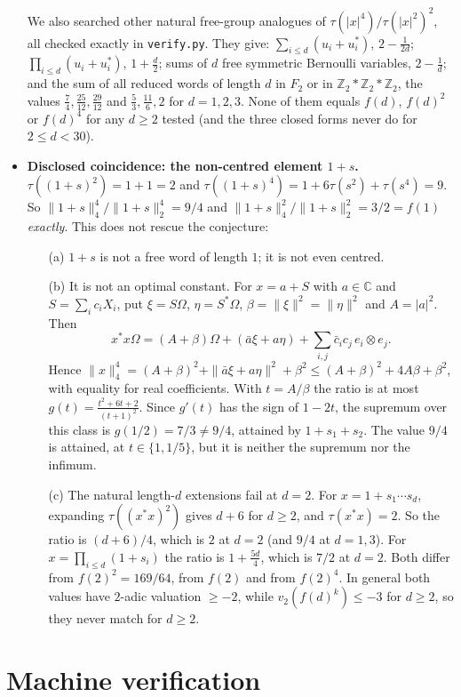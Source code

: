 \documentclass[11pt]{article}
\theoremstyle{definition}
\theoremstyle{remark}
\begin{document}
\begin{itemize}
We also searched other natural free-group analogues of $\tau(|x|^4)/\tau(|x|^2)^2$, all checked
exactly in \texttt{verify.py}. They give: $\sum_{i\le d}(u_i+u_i^*)$, $2-\frac1{2d}$;
$\prod_{i\le d}(u_i+u_i^*)$, $1+\frac d2$; sums of $d$ free symmetric Bernoulli variables,
$2-\frac1d$; and the sum of all reduced words of length $d$ in $F_2$ or in
$\mathbb Z_2*\mathbb Z_2*\mathbb Z_2$, the values $\frac74,\frac{25}{12},\frac{29}{12}$ and
$\frac53,\frac{11}6,2$ for $d=1,2,3$. None of them equals $f(d)$, $f(d)^2$ or $f(d)^4$ for any
$d\ge2$ tested (and the three closed forms never do for $2\le d<30$).
\item \textbf{Disclosed coincidence: the non-centred element $1+s$.} $\tau((1+s)^2)=1+1=2$ and
$\tau((1+s)^4)=1+6\tau(s^2)+\tau(s^4)=9$. So $\|1+s\|_4^4/\|1+s\|_2^4=9/4$ and
$\|1+s\|_4^2/\|1+s\|_2^2=3/2=f(1)$ \emph{exactly}. This does not rescue the conjecture:
\begin{enumerate}
\item[(a)] $1+s$ is not a free word of length $1$; it is not even centred.
\item[(b)] It is not an optimal constant. For $x=a+S$ with $a\in\mathbb C$ and
$S=\sum_ic_iX_i$, put $\xi=S\Omega$, $\eta=S^*\Omega$, $\beta=\|\xi\|^2=\|\eta\|^2$ and $A=|a|^2$.
Then
\[
x^*x\Omega=(A+\beta)\Omega+(\bar a\xi+a\eta)+\sum_{i,j}\bar c_ic_j\,e_i\otimes e_j .
\]
Hence $\|x\|_4^4=(A+\beta)^2+\|\bar a\xi+a\eta\|^2+\beta^2\le(A+\beta)^2+4A\beta+\beta^2$, with
equality for real coefficients. With $t=A/\beta$ the ratio is at most
$g(t)=\frac{t^2+6t+2}{(t+1)^2}$. Since $g'(t)$ has the sign of $1-2t$, the supremum over this class
is $g(1/2)=7/3\neq9/4$, attained by $1+s_1+s_2$. The value $9/4$ is attained, at $t\in\{1,1/5\}$,
but it is neither the supremum nor the infimum.
\item[(c)] The natural length-$d$ extensions fail at $d=2$. For $x=1+s_1\cdots s_d$, expanding
$\tau((x^*x)^2)$ gives $d+6$ for $d\ge2$, and $\tau(x^*x)=2$. So the ratio is $(d+6)/4$, which is
$2$ at $d=2$ (and $9/4$ at $d=1,3$). For $x=\prod_{i\le d}(1+s_i)$ the ratio is $1+\frac{5d}4$,
which is $7/2$ at $d=2$. Both differ from $f(2)^2=169/64$, from $f(2)$ and from $f(2)^4$. In
general both values have $2$-adic valuation $\ge-2$, while $v_2(f(d)^k)\le-3$ for $d\ge2$, so
they never match for $d\ge2$.
\end{enumerate}
\end{itemize}

\section{Machine verification}
\end{document}
